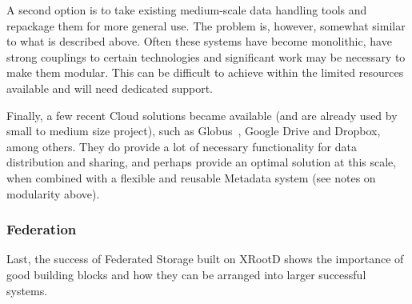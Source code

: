 A second option is to take existing medium-scale data handling tools and repackage them for more general use. The problem is, 
however, somewhat similar to what is described above. Often these systems have become monolithic, have strong couplings to certain 
technologies and significant work may be necessary to make them modular. This can be difficult to achieve within the limited resources
available and will need dedicated support.

Finally, a few recent Cloud solutions became available (and are already used by small to medium size project), such as Globus~\cite{globus},
Google Drive and Dropbox, among others. They do provide a lot of necessary functionality for data distribution and sharing, and perhaps
provide an optimal solution at this scale, when combined with a flexible and reusable Metadata system (see notes on modularity above).

\subsubsection{Federation}
Last, the success of Federated Storage built on XRootD shows the importance of good building blocks and how they can be arranged into 
larger successful systems.




